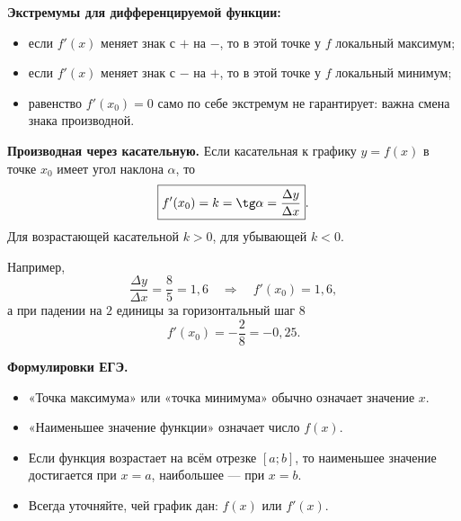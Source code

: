 \documentclass[a4paper,12pt]{article}
\newcommand{\key}[1]{\textcolor{darkaccent}{\textbf{#1}}}
\begin{document}
\key{Экстремумы для дифференцируемой функции:}
\begin{itemize}
  \item если $f'(x)$ меняет знак с $+$ на $-$, то в этой точке у $f$ локальный максимум;
  \item если $f'(x)$ меняет знак с $-$ на $+$, то в этой точке у $f$ локальный минимум;
  \item равенство $f'(x_0)=0$ само по себе экстремум не гарантирует: важна смена знака производной.
\end{itemize}

\begin{center}
\end{center}

\key{Производная через касательную.} Если касательная к графику $y=f(x)$ в точке $x_0$ имеет угол наклона $\alpha$, то
\[
\boxed{f'(x_0)=k=\tg\alpha=\frac{\Delta y}{\Delta x}}.
\]
Для возрастающей касательной $k>0$, для убывающей $k<0$.

Например,
\[
\frac{\Delta y}{\Delta x}=\frac85=1,6
\quad\Longrightarrow\quad
f'(x_0)=1,6,
\]
а при падении на $2$ единицы за горизонтальный шаг $8$
\[
f'(x_0)=-\frac28=-0,25.
\]

\key{Формулировки ЕГЭ.}
\begin{itemize}
  \item «Точка максимума» или «точка минимума» обычно означает значение $x$.
  \item «Наименьшее значение функции» означает число $f(x)$.
  \item Если функция возрастает на всём отрезке $[a;b]$, то наименьшее значение достигается при $x=a$, наибольшее --- при $x=b$.
  \item Всегда уточняйте, чей график дан: $f(x)$ или $f'(x)$.
\end{itemize}
\end{document}
